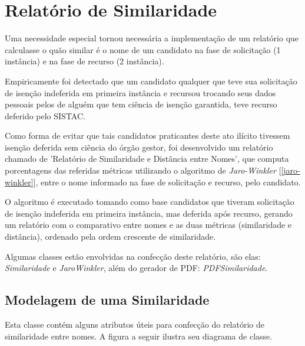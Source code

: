 \documentclass[
	12pt,			%
	openright,		%
	oneside,	
	a4paper,		%
	english,		%
	brazil			%
]{abntex2/abntex2}  %
\begin{document}
		\section{Relatório de Similaridade} \label{similaridade}
		
			Uma necessidade especial tornou necessária a implementação de um relatório que calculasse o quão similar é o nome de um candidato na fase de solicitação (1{\textordfeminine} instância) e na fase de recurso (2{\textordfeminine} instância).
			
			Empiricamente foi detectado que um candidato qualquer que teve sua solicitação de isenção indeferida em primeira instância e recursou trocando seus dados pessoais pelos de alguém que tem ciência de isenção garantida, teve recurso deferido pelo SISTAC.
			
			Como forma de evitar que tais candidatos praticantes deste ato ilícito tivessem isenção deferida sem ciência do órgão gestor, foi desenvolvido um relatório chamado de 'Relatório de Similaridade e Distância entre Nomes', que computa porcentagens das referidas métricas utilizando o algoritmo de \textit{Jaro-Winkler} [\ref{jaro-winkler}], entre o nome informado na fase de solicitação e recurso, pelo candidato.
			
			O algoritmo é executado tomando como base candidatos que tiveram solicitação de isenção indeferida em primeira instância, mas deferida após recurso, gerando um relatório com o comparativo entre nomes e as duas métricas (similaridade e distância), ordenado pela ordem crescente de similaridade.
			
			Algumas classes estão envolvidas na confecção deste relatório, são elas: \textit{Similaridade} e \textit{JaroWinkler}, além do gerador de PDF: \textit{PDFSimilaridade}.
			
			\subsection{Modelagem de uma Similaridade}
			
				Esta classe contém alguns atributos úteis para confecção do relatório de similaridade entre nomes. A figura a seguir ilustra seu diagrama de classe.
				
\end{document}
